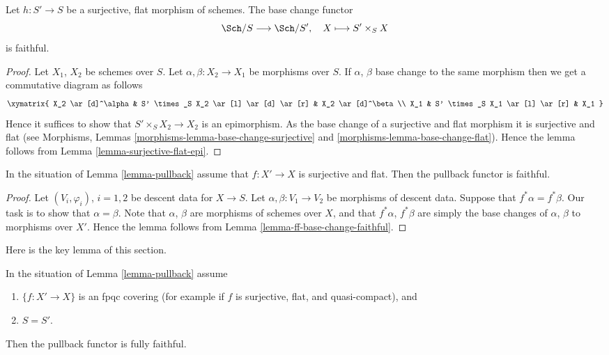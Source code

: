 \begin{lemma}
\label{lemma-ff-base-change-faithful}
Let $h : S' \to S$ be a surjective, flat morphism of
schemes. The base change functor
$$
\Sch/S \longrightarrow \Sch/S', \quad
X \longmapsto S' \times_S X
$$
is faithful.
\end{lemma}

\begin{proof}
Let $X_1$, $X_2$ be schemes over $S$.
Let $\alpha, \beta : X_2 \to X_1$ be morphisms over $S$.
If $\alpha$, $\beta$ base change to the same morphism then
we get a commutative diagram as follows
$$
\xymatrix{
X_2 \ar[d]^\alpha &
S' \times_S X_2 \ar[l] \ar[d] \ar[r] &
X_2 \ar[d]^\beta \\
X_1 &
S' \times_S X_1 \ar[l] \ar[r] &
X_1
}
$$
Hence it suffices to show that $S' \times_S X_2 \to X_2$
is an epimorphism. As the base change of a surjective and
flat morphism it is surjective and flat (see
Morphisms, Lemmas \ref{morphisms-lemma-base-change-surjective}
and \ref{morphisms-lemma-base-change-flat}). Hence the lemma follows
from Lemma \ref{lemma-surjective-flat-epi}.
\end{proof}

\begin{lemma}
\label{lemma-faithful}
In the situation of Lemma \ref{lemma-pullback}
assume that $f : X' \to X$ is surjective
and flat. Then the pullback functor is faithful.
\end{lemma}

\begin{proof}
Let $(V_i, \varphi_i)$, $i = 1, 2$ be descent data for $X \to S$.
Let $\alpha, \beta : V_1 \to V_2$ be morphisms of descent data.
Suppose that $f^*\alpha = f^*\beta$. Our task is to show that
$\alpha = \beta$. Note that $\alpha$, $\beta$ are morphisms
of schemes over $X$, and that $f^*\alpha$, $f^*\beta$ are
simply the base changes of $\alpha$, $\beta$ to morphisms over
$X'$. Hence the lemma follows from Lemma \ref{lemma-ff-base-change-faithful}.
\end{proof}

\noindent
Here is the key lemma of this section.

\begin{lemma}
\label{lemma-fully-faithful}
In the situation of Lemma \ref{lemma-pullback}
assume
\begin{enumerate}
\item $\{f : X' \to X\}$ is an fpqc covering (for example if $f$ is
surjective, flat, and quasi-compact), and
\item $S = S'$.
\end{enumerate}
Then the pullback functor is fully faithful.
\end{lemma}

